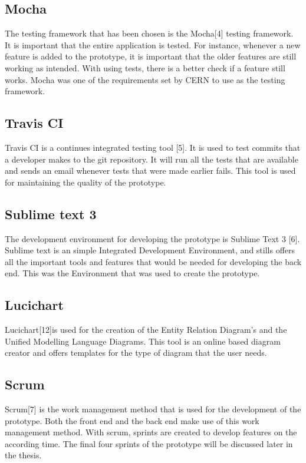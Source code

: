 \documentclass[paper=a4, fontsize=11pt,twoside]{scrartcl}	%
\begin{document}
\subsection{Mocha}
The testing framework that has been chosen is the Mocha[4] testing framework. It is important that the entire application is tested. For instance, whenever a new feature is added to the prototype, it is important that the older features are still working as intended. With using tests, there is a better check if a feature still works. Mocha was one of the requirements set by CERN to use as the testing framework.

\subsection{Travis CI}
Travis CI is a continues integrated testing tool [5]. It is used to test commits that a developer makes to the git repository. It will run all the tests that are available and sends an email whenever tests that were made earlier fails. This tool is used for maintaining the quality of the prototype.

\subsection{Sublime text 3}
The development environment for developing the prototype is Sublime Text 3 [6]. Sublime text is an simple Integrated Development Environment, and stills offers all the important tools and features that would be needed for developing the back end. This was the Environment that was used to create the prototype.

\subsection{Lucichart}
Lucichart[12]is used for the creation of the Entity Relation Diagram's and the Unified Modelling Language Diagrams. This tool is an online based diagram creator and offers templates for the type of diagram that the user needs.  

\subsection{Scrum}
Scrum[7] is the work management method that is used for the development of the prototype. Both the front end and the back end make use of this work management method. With scrum, sprints are created to develop features on the according time. The final four sprints of the prototype will be discussed later in the thesis.  
\end{document}
